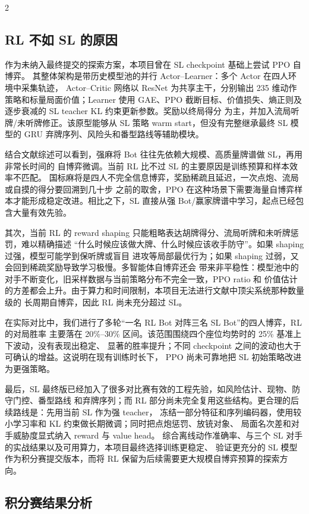 \documentclass{article}
\begin{document}
\begin{multicols}{2}
\subsection{RL 不如 SL 的原因}

作为未纳入最终提交的探索方案，本项目曾在 SL checkpoint 基础上尝试 PPO 自博弈。
其整体架构是带历史模型池的并行 Actor--Learner：多个 Actor 在四人环境中采集轨迹，
Actor--Critic 网络以 ResNet 为共享主干，分别输出 235 维动作策略和标量局面价值；Learner 使用
GAE、PPO 截断目标、价值损失、熵正则及逐步衰减的 SL teacher KL 约束更新参数。奖励以终局得分
为主，并加入流局听牌/未听牌修正。该原型能够从 SL 策略 warm start，但没有完整继承最终 SL
模型的 GRU 弃牌序列、风险头和番型路线等辅助模块。

结合文献综述可以看到，强麻将 Bot 往往先依赖大规模、高质量牌谱做 SL，再用非常长时间的
自博弈微调。当前 RL 比不过 SL 的主要原因是训练预算和样本效率不匹配。
国标麻将是四人不完全信息博弈，奖励稀疏且延迟，一次点炮、流局或自摸的得分要回溯到几十步
之前的取舍，PPO 在这种场景下需要海量自博弈样本才能形成稳定改进。相比之下，SL 直接从强
Bot/赢家牌谱中学习，起点已经包含大量有效先验。

其次，当前 RL 的 reward shaping 只能粗略表达胡牌得分、流局听牌和未听牌惩罚，难以精确描述
“什么时候应该做大牌、什么时候应该收手防守”。如果 shaping 过强，模型可能学到保听牌或盲目
进攻等局部最优行为；如果 shaping 过弱，又会回到稀疏奖励导致学习极慢。多智能体自博弈还会
带来非平稳性：模型池中的对手不断变化，旧采样数据与当前策略分布不完全一致，PPO ratio 和
价值估计的方差都会上升。由于算力和时间限制，本项目无法进行文献中顶尖系统那种数量级的
长周期自博弈，因此 RL 尚未充分超过 SL。

在实际对比中，我们进行了多轮“一名 RL Bot 对阵三名 SL Bot”的四人博弈，RL 的对局胜率
主要落在 20\%--30\% 区间。该范围围绕四个座位均势时的 25\% 基准上下波动，没有表现出稳定、
显著的胜率提升；不同 checkpoint 之间的波动也大于可确认的增益。这说明在现有训练时长下，
PPO 尚未可靠地把 SL 初始策略改进为更强策略。

最后，SL 最终版已经加入了很多对比赛有效的工程先验，如风险估计、现物、防守门控、番型路线
和弃牌序列；而 RL 部分尚未完全复用这些结构。更合理的后续路线是：先用当前 SL 作为强 teacher，
冻结一部分特征和序列编码器，使用较小学习率和 KL 约束做长期微调；同时把点炮惩罚、放铳对象、
局面名次差和对手威胁度显式纳入 reward 与 value head。
综合离线动作准确率、与三个 SL 对手的实战结果以及可用算力，本项目最终选择训练更稳定、
验证更充分的 SL 模型作为积分赛提交版本，而将 RL 保留为后续需要更大规模自博弈预算的探索方向。

\subsection{积分赛结果分析}


\end{multicols}
\end{document}
